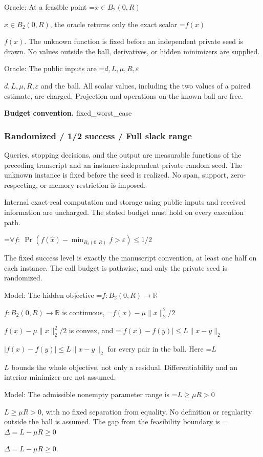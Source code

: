 \documentclass[10pt,a4paper]{article}
\newcommand{\AtlasMath}[1]{\par\begingroup\centering\setbox0=\hbox{$\displaystyle #1$}\ifdim\wd0>1.4\linewidth\typeout{ATLAS WIDE FORMULA: \the\wd0}\fi\ifdim\wd0>\linewidth\resizebox{\linewidth}{!}{\box0}\else\box0\fi\par\endgroup}
\newcommand{\AtlasInlineMath}[1]{\begingroup\setbox0=\hbox{$#1$}\ifdim\wd0>.4\linewidth\endgroup\AtlasMath{#1}\else\endgroup$#1$\fi}
\begin{document}
Oracle: At a feasible point \AtlasInlineMath{x\in B_2(0,R)}, the oracle returns only the exact scalar \AtlasInlineMath{f(x)}. The unknown function is fixed before an independent private seed is drawn. No values outside the ball, derivatives, or hidden minimizers are supplied.



Oracle: The public inputs are \AtlasInlineMath{d,L,\mu,R,\varepsilon} and the ball. All scalar values, including the two values of a paired estimate, are charged. Projection and operations on the known ball are free.



\textbf{Budget convention.} fixed\_worst\_case



\subsubsection{Randomized / 1/2 success / Full slack range}


Queries, stopping decisions, and the output are measurable functions of the preceding transcript and an instance-independent private random seed. The unknown instance is fixed before the seed is realized. No span, support, zero-respecting, or memory restriction is imposed.



Internal exact-real computation and storage using public inputs and received information are uncharged. The stated budget must hold on every execution path.




\AtlasMath{\forall f:\ \Pr(f(\widehat x)-\min_{B_2(0,R)}f>\varepsilon)\le1/2}




The fixed success level is exactly the manuscript convention, at least one half on each instance. The call budget is pathwise, and only the private seed is randomized.



Model: The hidden objective \AtlasInlineMath{f:B_2(0,R)\to\mathbb R} is continuous, \AtlasInlineMath{f(x)-\mu\|x\|_2^2/2} is convex, and \AtlasInlineMath{|f(x)-f(y)|\le L\|x-y\|_2} for every pair in the ball. Here \AtlasInlineMath{L} bounds the whole objective, not only a residual. Differentiability and an interior minimizer are not assumed.



Model: The admissible nonempty parameter range is \AtlasInlineMath{L\ge\mu R>0}, with no fixed separation from equality. No definition or regularity outside the ball is assumed. The gap from the feasibility boundary is \AtlasInlineMath{\Delta=L-\mu R\ge0}.
\end{document}
